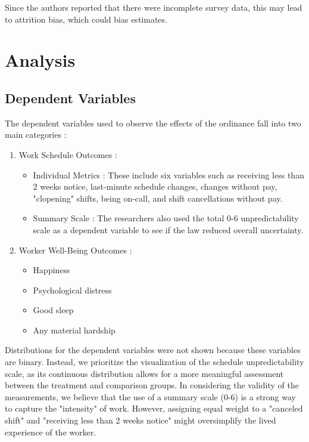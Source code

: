 \documentclass{article}
\begin{document}
 	Since the authors reported that there were incomplete survey data, this may lead to attrition bias, which could bias estimates.
 	

	\section{Analysis}
	\subsection{Dependent Variables}
	The dependent variables used to observe the effects of the ordinance fall into two main categories :
	\begin{enumerate}
		\item Work Schedule Outcomes :
		\begin{itemize}
			\item Individual Metrics : These include six variables such as receiving less than 2 weeks notice, last-minute schedule changes, changes without pay, "clopening" shifts, being on-call, and shift cancellations without pay.
			\item Summary Scale : The researchers also used the total 0-6 unpredictability scale as a dependent variable to see if the law reduced overall uncertainty.
		\end{itemize}
		\item Worker Well-Being Outcomes : 
		\begin{itemize}
			\item Happiness
			\item Psychological distress
			\item Good sleep
			\item Any material hardship
		\end{itemize}
	\end{enumerate} 
	
	Distributions for the dependent variables were not shown because these variables are binary. Instead, we prioritize the visualization of the schedule unpredictability scale, as its continuous distribution allows for a more meaningful assessment between the treatment and comparison groups. In considering the validity of the measurements, we believe that the use of a summary scale (0-6) is a strong way to capture the "intensity" of work. However, assigning equal weight to a "canceled shift" and "receiving less than 2 weeks notice" might oversimplify the lived experience of the worker. 
	
\end{document}
